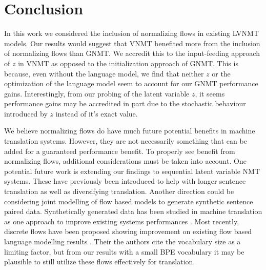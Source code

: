\chapter{Conclusion}

In this work we considered the inclusion of normalizing flows in existing \ac{LVNMT} models. Our results would suggest that \ac{VNMT} benefited more from the inclusion of normalizing flows than \ac{GNMT}. We accredit this to the input-feeding approach of $z$ in \ac{VNMT} as opposed to the initialization approach of \ac{GNMT}. This is because, even without the language model, we find that neither $z$ or the optimization of the language model seem to account for our \ac{GNMT} performance gains. Interestingly, from our probing of the latent variable $z$, it seems performance gains may be accredited in part due to the stochastic behaviour introduced by $z$ instead of it's exact value. 

We believe normalizing flows do have much future potential benefits in machine translation systems. However, they are not necessarily something that can be added for a guaranteed performance benefit. To properly see benefit from normalizing flows, additional considerations must be taken into account. One potential future work is extending our findings to sequential latent variable \ac{NMT} systems. These have previously been introduced to help with longer sentence translation as well as diversifying translation. Another direction could be considering joint modelling of flow based models to generate synthetic sentence paired data. Synthetically generated data has been studied in machine translation as one approach to improve existing systems performances \cite{sennrich2015ImprovingNMT}. Most recently, discrete flows have been proposed showing improvement on existing flow based language modelling results \cite{tran2019discreteflows}. Their the authors cite the vocabulary size as a limiting factor, but from our results with a small \ac{BPE} vocabulary it may be plausible to still utilize these flows effectively for translation. 



 